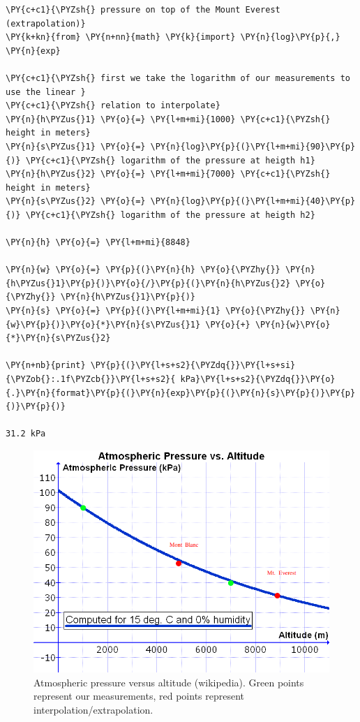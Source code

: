 \begin{tcolorbox}[breakable, size=fbox, boxrule=1pt, pad at break*=1mm,colback=cellbackground, colframe=cellborder]
\begin{Verbatim}[commandchars=\\\{\}]
\PY{c+c1}{\PYZsh{} pressure on top of the Mount Everest (extrapolation)}
\PY{k+kn}{from} \PY{n+nn}{math} \PY{k}{import} \PY{n}{log}\PY{p}{,} \PY{n}{exp}

\PY{c+c1}{\PYZsh{} first we take the logarithm of our measurements to use the linear }
\PY{c+c1}{\PYZsh{} relation to interpolate}
\PY{n}{h\PYZus{}1} \PY{o}{=} \PY{l+m+mi}{1000} \PY{c+c1}{\PYZsh{} height in meters}
\PY{n}{s\PYZus{}1} \PY{o}{=} \PY{n}{log}\PY{p}{(}\PY{l+m+mi}{90}\PY{p}{)} \PY{c+c1}{\PYZsh{} logarithm of the pressure at heigth h1}
\PY{n}{h\PYZus{}2} \PY{o}{=} \PY{l+m+mi}{7000} \PY{c+c1}{\PYZsh{} height in meters}
\PY{n}{s\PYZus{}2} \PY{o}{=} \PY{n}{log}\PY{p}{(}\PY{l+m+mi}{40}\PY{p}{)} \PY{c+c1}{\PYZsh{} logarithm of the pressure at heigth h2}

\PY{n}{h} \PY{o}{=} \PY{l+m+mi}{8848}

\PY{n}{w} \PY{o}{=} \PY{p}{(}\PY{n}{h} \PY{o}{\PYZhy{}} \PY{n}{h\PYZus{}1}\PY{p}{)}\PY{o}{/}\PY{p}{(}\PY{n}{h\PYZus{}2} \PY{o}{\PYZhy{}} \PY{n}{h\PYZus{}1}\PY{p}{)}
\PY{n}{s} \PY{o}{=} \PY{p}{(}\PY{l+m+mi}{1} \PY{o}{\PYZhy{}} \PY{n}{w}\PY{p}{)}\PY{o}{*}\PY{n}{s\PYZus{}1} \PY{o}{+} \PY{n}{w}\PY{o}{*}\PY{n}{s\PYZus{}2}

\PY{n+nb}{print} \PY{p}{(}\PY{l+s+s2}{\PYZdq{}}\PY{l+s+si}{\PYZob{}:.1f\PYZcb{}}\PY{l+s+s2}{ kPa}\PY{l+s+s2}{\PYZdq{}}\PY{o}{.}\PY{n}{format}\PY{p}{(}\PY{n}{exp}\PY{p}{(}\PY{n}{s}\PY{p}{)}\PY{p}{)}\PY{p}{)}

31.2 kPa
\end{Verbatim}
\end{tcolorbox}

\begin{figure}
\centering
\includegraphics[width=0.6\linewidth]{Atmospheric_Pressure_vs._Altitude.png}
\caption{Atmospheric pressure versus altitude (wikipedia). Green points
represent our measurements, red points represent
interpolation/extrapolation.}
\end{figure}

